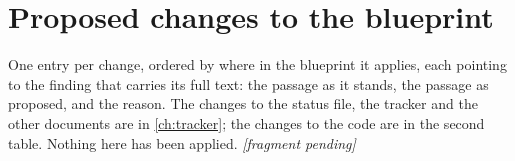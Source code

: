 \chapter{Proposed changes to the blueprint}\label{ch:changes}

One entry per change, ordered by where in the blueprint it applies, each pointing to the
finding that carries its full text: the passage as it stands, the passage as proposed, and
the reason. The changes to the status file, the tracker and the other documents are in
\cref{ch:tracker}; the changes to the code are in the second table. Nothing here has been
applied.
\ifchangesready{}\else\emph{[fragment pending]}\fi
